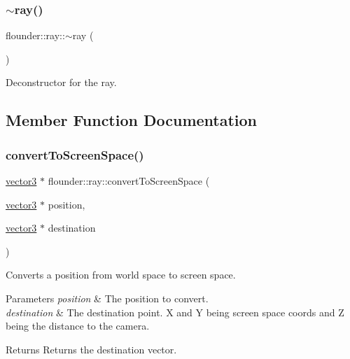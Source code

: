 \subsubsection{\texorpdfstring{$\sim$ray()}{~ray()}}
{\footnotesize\ttfamily flounder\+::ray\+::$\sim$ray (\begin{DoxyParamCaption}{ }\end{DoxyParamCaption})}



Deconstructor for the ray. 



\subsection{Member Function Documentation}
\mbox{\label{classflounder_1_1ray_acaa86f1a2a66ab56e7854a4ea11160a7}} 
\subsubsection{\texorpdfstring{convert\+To\+Screen\+Space()}{convertToScreenSpace()}}
{\footnotesize\ttfamily \hyperlink{classflounder_1_1vector3}{vector3} $\ast$ flounder\+::ray\+::convert\+To\+Screen\+Space (\begin{DoxyParamCaption}\item[{\hyperlink{classflounder_1_1vector3}{vector3} $\ast$}]{position,  }\item[{\hyperlink{classflounder_1_1vector3}{vector3} $\ast$}]{destination }\end{DoxyParamCaption})}



Converts a position from world space to screen space. 


\begin{DoxyParams}{Parameters}
{\em position} & The position to convert. \\
\hline
{\em destination} & The destination point. X and Y being screen space coords and Z being the distance to the camera. \\
\hline
\end{DoxyParams}
\begin{DoxyReturn}{Returns}
Returns the destination vector. 
\end{DoxyReturn}
\mbox{\label{classflounder_1_1ray_a675aec0722a9db426b32f598fdd3157a}} 
